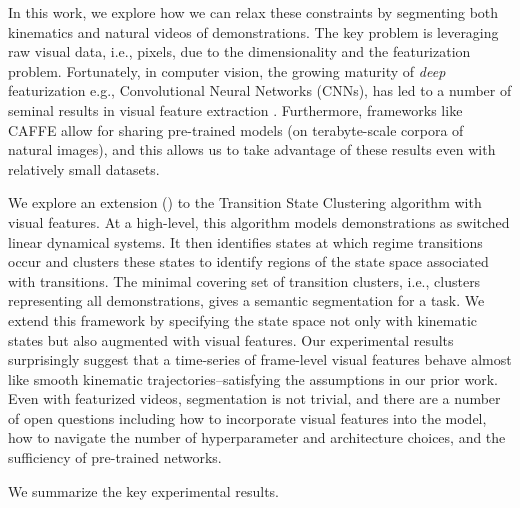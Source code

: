 In this work, we explore how we can relax these constraints by segmenting both kinematics and natural videos of demonstrations.
The key problem is leveraging raw visual data, i.e., pixels, due to the dimensionality and the featurization problem.
Fortunately, in computer vision, the growing maturity of \emph{deep} featurization e.g., Convolutional Neural Networks (CNNs), has led to a number of seminal results in visual feature extraction \cite{krizhevsky2012imagenet, lecun1995convolutional, jia2014caffe, long2014fully}.
Furthermore, frameworks like CAFFE \cite{jia2014caffe} allow for sharing pre-trained models (on terabyte-scale corpora of natural images), and this allows us to take advantage of these results even with relatively small datasets.

We explore an extension (\sys) to the Transition State Clustering algorithm \cite{krishnan2015tsc} with visual features.
At a high-level, this algorithm models demonstrations as switched linear dynamical systems.
It then identifies states at which regime transitions occur and clusters these states to identify regions of the state space associated with transitions.
The minimal covering set  of transition clusters, i.e., clusters representing all demonstrations, gives a semantic segmentation for a task. 
We extend this framework by specifying the state space not only with kinematic states but also augmented with visual features.
Our experimental results surprisingly 
    suggest that a time-series of frame-level visual features behave almost like smooth kinematic trajectories--satisfying the assumptions in our prior work.
Even with featurized videos, segmentation is not trivial, and there are a number of open questions including how to incorporate visual features into the model, how to navigate the number of hyperparameter and architecture choices, and the sufficiency of pre-trained networks.

We summarize the key experimental results.

\vspace{0.25em}

